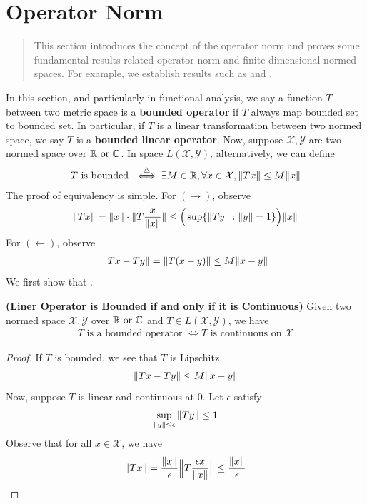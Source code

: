 \documentclass{report}
\begin{document}
\section{Operator Norm}
\begin{abstract}
This section introduces the concept of the operator norm and proves some fundamental results related operator norm and finite-dimensional normed spaces. For example, we establish results such as  and .
\end{abstract}
\begin{mdframed}
In this section, and particularly in functional analysis, we say a function $T$ between two metric space is a  \textbf{bounded operator} if $T$ always map bounded set to bounded set. In particular, if $T$ is a linear transformation between two normed space, we say $T$ is a \textbf{bounded linear operator}. Now, suppose $\mathcal{X},\mathcal{Y}$ are two normed space over $\mathbb{R}\text{ or }\mathbb{C}$. In space $L(\mathcal{X},\mathcal{Y})$, alternatively, we can define 
\begin{align*}
T\text{ is bounded } \overset{\triangle}{\iff} \exists M\in\mathbb{R},\forall x\in \mathcal{X}, \| Tx \|\leq M\| x \|
\end{align*}
The proof of equivalency is simple. For $(\longrightarrow )$, observe 
\begin{align*}
\| Tx \|= \| x \|\cdot\| T \frac{x}{\| x \|} \|\leq \Big(\sup \{ \| Ty \|:\| y \|=1 \} \Big)\| x \|
\end{align*}
For $(\longleftarrow)$, observe 
\begin{align*}
\| Tx-Ty \|=\| T(x-y) \|\leq M \| x-y \|
\end{align*}
We first show that . 
\end{mdframed}
\begin{theorem}
\label{LOB}
\textbf{(Liner Operator is Bounded if and only if it is Continuous)} Given two normed space $\mathcal{X},\mathcal{Y}$ over $\mathbb{R}\text{ or }\mathbb{C}$ and  $T\in L(\mathcal{X},\mathcal{Y})$, we have 
\begin{align*}
T\text{ is a bounded operator }\iff T\text{ is continuous on $\mathcal{X}$}
\end{align*}
\end{theorem}
\begin{proof}
If $T$ is bounded, we see that $T$ is Lipschitz. 
\begin{align*}
\| Tx-Ty \|\leq M \| x-y \|
\end{align*}
Now, suppose $T$ is linear and continuous at $0$. Let $\epsilon $ satisfy 
\begin{align*}
\sup_{\| y \|\leq \epsilon } \| Ty \| \leq 1
\end{align*}
Observe that for all $x \in \mathcal{X}$, we have
\begin{align*}
\| Tx \|= \frac{\| x \|}{\epsilon } \Big\| T \frac{\epsilon x}{\| x \|} \Big\|\leq \frac{\| x \|}{\epsilon}
\end{align*}
\end{proof}
\end{document}

